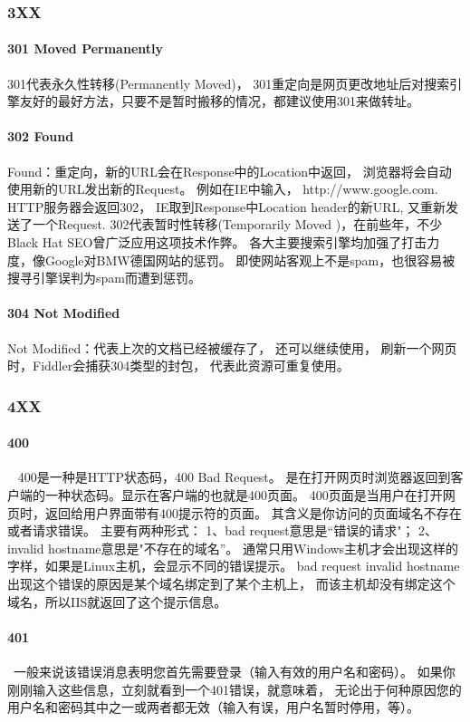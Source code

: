 \documentclass{book}
\begin{document}
\subsubsection{3XX}

\paragraph{301 Moved Permanently}301代表永久性转移(Permanently Moved)，
301重定向是网页更改地址后对搜索引擎友好的最好方法，只要不是暂时搬移的情况，都建议使用301来做转址。

\paragraph{302 Found} Found：重定向，新的URL会在Response中的Location中返回，
浏览器将会自动使用新的URL发出新的Request。
例如在IE中输入， http://www.google.com. HTTP服务器会返回302， 
IE取到Response中Location header的新URL, 又重新发送了一个Request.
302代表暂时性转移(Temporarily Moved )，在前些年，不少Black Hat SEO曾广泛应用这项技术作弊。
各大主要搜索引擎均加强了打击力度，像Google对BMW德国网站的惩罚。
即使网站客观上不是spam，也很容易被搜寻引擎误判为spam而遭到惩罚。

\paragraph{304 Not Modified} Not Modified：代表上次的文档已经被缓存了， 还可以继续使用，
刷新一个网页时，Fiddler会捕获304类型的封包，
代表此资源可重复使用。

\subsubsection{4XX}

\paragraph{400}~ 400是一种是HTTP状态码，400 Bad Request。
是在打开网页时浏览器返回到客户端的一种状态码。显示在客户端的也就是400页面。
400页面是当用户在打开网页时，返回给用户界面带有400提示符的页面。
其含义是你访问的页面域名不存在或者请求错误。
主要有两种形式：
1、bad request意思是“错误的请求"；
2、invalid hostname意思是"不存在的域名”。
通常只用Windows主机才会出现这样的字样，如果是Linux主机，会显示不同的错误提示。
bad request invalid hostname出现这个错误的原因是某个域名绑定到了某个主机上，
而该主机却没有绑定这个域名，所以IIS就返回了这个提示信息。

\paragraph{401}~一般来说该错误消息表明您首先需要登录（输入有效的用户名和密码）。
如果你刚刚输入这些信息，立刻就看到一个401错误，就意味着，
无论出于何种原因您的用户名和密码其中之一或两者都无效（输入有误，用户名暂时停用，等）。
\end{document}
